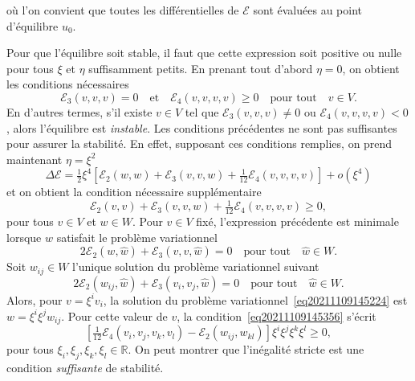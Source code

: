 \documentclass[12pt, final]{amsart}
\begin{document}
où l'on convient que toutes les différentielles de $\mathcal{E}$ sont
évaluées au point d'équilibre $u_0$.

Pour que l'équilibre soit stable, il faut que cette expression soit
positive ou nulle pour tous $\xi$ et $\eta$ suffisamment petits. En prenant
tout d'abord $\eta = 0$, on obtient les conditions nécessaires
\begin{equation}
  \label{eq20211108164416} \mathcal{E}_3 (v, v, v) = 0 \quad \text{et} \quad
  \mathcal{E}_4 (v, v, v, v) \geq 0 \quad \text{pour tout} \quad v \in V.
\end{equation}
En d'autres termes, s'il existe $v \in V$ tel que $\mathcal{E}_3 (v, v, v)
\neq 0$ ou $\mathcal{E}_4 (v, v, v, v) < 0$, alors l'équilibre est
\emph{instable}. Les conditions précédentes ne sont pas suffisantes
pour assurer la stabilité. En effet, supposant ces conditions remplies, on
prend maintenant $\eta = \xi^2$
\begin{equation}
  \Delta \mathcal{E}= \tfrac{1}{2} \xi^4  \left[ \mathcal{E}_2 (w, w)
  +\mathcal{E}_3 (v, v, w) + \tfrac{1}{12} \mathcal{E}_4 (v, v, v, v) \right]
  + o (\xi^4)
\end{equation}
et on obtient la condition nécessaire supplémentaire
\begin{equation}
  \label{eq20211109145356} \mathcal{E}_2 (v, v) +\mathcal{E}_3 (v, v, w) +
  \tfrac{1}{12} \mathcal{E}_4 (v, v, v, v) \geq 0,
\end{equation}
pour tous $v \in V$ et $w \in W$. Pour $v \in V$ fixé, l'expression
précédente est minimale lorsque $w$ satisfait le problème
variationnel
\begin{equation}
  \label{eq20211109145224} 2\mathcal{E}_2 (w, \hat{w}) +\mathcal{E}_3 (v, v,
  \hat{w}) = 0 \quad \text{pour tout} \quad \hat{w} \in W.
\end{equation}
Soit $w_{i  j} \in W$ l'unique solution du problème variationnel
suivant
\begin{equation}
  \label{eq20211221155859} 2\mathcal{E}_2 (w_{i  j}, \hat{w})
  +\mathcal{E}_3 (v_i, v_j, \hat{w}) = 0 \quad \text{pour tout} \quad \hat{w}
  \in W.
\end{equation}
Alors, pour $v = \xi^i v_i$, la solution du problème
variationnel~\eqref{eq20211109145224} est $w = \xi^i \xi^j w_{i  j}$.
Pour cette valeur de $v$, la condition~\eqref{eq20211109145356} s'écrit
\begin{equation}
  \left[ \tfrac{1}{12} \mathcal{E}_4 (v_i, v_j, v_k, v_l) -\mathcal{E}_2 (w_{i
   j}, w_{k  l}) \right] \xi^i \xi^j \xi^k \xi^l \geq 0,
\end{equation}
pour tous $\xi_i, \xi_j, \xi_k, \xi_l \in \mathbb{R}$. On peut montrer que
l'inégalité stricte est une condition \emph{suffisante} de
stabilité.
\end{document}
